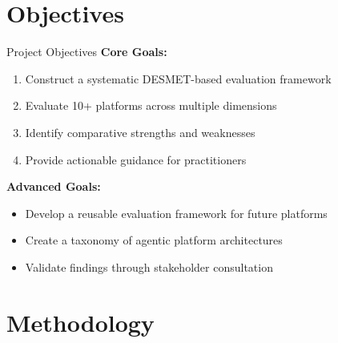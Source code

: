 \documentclass[aspectratio=169]{beamer}
\begin{document}
\section{Objectives}

\begin{frame}{Project Objectives}
    \textbf{Core Goals:}
    \begin{enumerate}
        \item Construct a systematic DESMET-based evaluation framework
        \item Evaluate 10+ platforms across multiple dimensions
        \item Identify comparative strengths and weaknesses
        \item Provide actionable guidance for practitioners
    \end{enumerate}

    \vspace{0.5cm}
    \textbf{Advanced Goals:}
    \begin{itemize}
        \item Develop a reusable evaluation framework for future platforms
        \item Create a taxonomy of agentic platform architectures
        \item Validate findings through stakeholder consultation
    \end{itemize}
\end{frame}

\section{Methodology}
\end{document}
